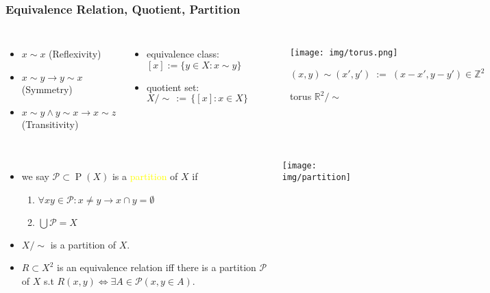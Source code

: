 \documentclass[UTF8,aspectratio=43,11pt,colorlinks,compress,openany]{beamer}%
\begin{document}
\begin{frame}\frametitle{Equivalence Relation, Quotient, Partition}
\begin{columns}
	\begin{itemize}
		\item $x\sim x$ \quad (Reflexivity)
		\item $x\sim y\to y\sim x$ \quad (Symmetry)
		\item $x\sim y\wedge y\sim x\to x\sim z$ \quad (Transitivity)
	\end{itemize}
\begin{itemize}
	\item equivalence class: $[x]:=\{y\in X: x\sim y\}$
	\item quotient set: $X/\sim\,:=\,\big\{[x]: x\in X\big\}$
\end{itemize}
\vspace{-6ex}
\begin{figure}[H]
\texttt{[image: img/torus.png]}\vspace{-5ex}\caption{torus $\mathbb{R}^2/\sim$}{\scriptsize $(x,y)\sim(x',y')\;:=\;(x-x',y-y')\in\mathbb{Z}^2$}
\end{figure}
\end{columns}
\begin{columns}
\begin{itemize}
	\item we say $\mathcal{P}\subset \operatorname{P}(X)$ is a \textcolor{yellow}{partition} of $X$ if
	\begin{enumerate}
		\item $\forall xy\in\mathcal{P}: x\neq y\to x\cap y=\emptyset$
		\item $\bigcup\mathcal{P}=X$
	\end{enumerate}
	\item $X/\sim$ is a partition of $X$.
	\item $R\subset X^2$ is an equivalence relation iff there is a partition $\mathcal{P}$ of $X$ s.t $R(x,y)\iff\exists A\in\mathcal{P} (x,y\in A)$.
\end{itemize}
\texttt{[image: img/partition]}
\end{columns}
\end{frame}
\end{document}
